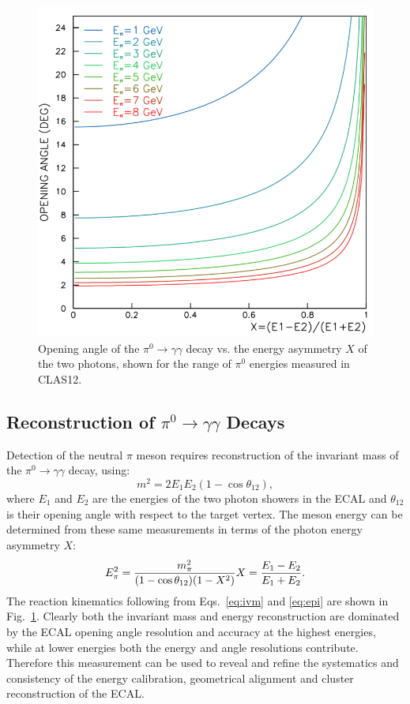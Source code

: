 \begin{figure}[t]
\centering
\includegraphics[width=0.7\columnwidth,keepaspectratio]{img/opa.png}
\caption[]{Opening angle of the $\pi^0 \rightarrow \gamma \gamma$ decay vs. the energy asymmetry $X$ of
  the two photons, shown for the range of $\pi^0$ energies measured in CLAS12.}
\label{fig:opa}
\end{figure}

\subsection{Reconstruction of $\pi^0\rightarrow \gamma \gamma$ Decays}

Detection of the neutral $\pi$ meson requires reconstruction of the invariant mass of the
$\pi^0 \rightarrow \gamma \gamma$ decay, using:
\begin{equation}
m^2 = 2 E_1 E_2 (1-\cos \theta_{12}),
\label{eq:ivm}
\end{equation}
where $E_1$ and $E_2$ are the energies of the two photon showers in the ECAL and $\theta_{12}$ is their opening
angle with respect to the target vertex. The meson energy can be determined from these same measurements in
terms of the photon energy asymmetry $X$:
\begin{equation}
E^2_{\pi} = \frac{m^2_{\pi}}{(1-\cos \theta_{12})(1-X^2)}  \\
X=\frac{E_1-E_2}{E_1+E_2}.
\label{eq:epi}
\end{equation}
The reaction kinematics following from Eqs.~\ref{eq:ivm} and \ref{eq:epi} are shown in Fig.~\ref{fig:opa}. Clearly
both the invariant mass and energy reconstruction are dominated by the ECAL opening angle resolution and accuracy
at the highest energies, while at lower energies both the energy and angle resolutions contribute. Therefore this
measurement can be used to reveal and refine the systematics and consistency of the energy calibration, geometrical
alignment and cluster reconstruction of the ECAL.

